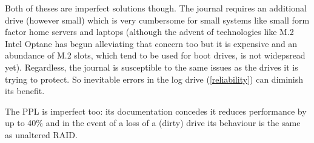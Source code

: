         Both of theses are imperfect solutions though. The journal requires an
        additional drive (however small) which is very cumbersome for small
        systems like small form factor home servers and laptops (although the
        advent of technologies like M.2 Intel Optane \cite{Optane_homepage} has
        begun alleviating that concern too but it is expensive and an abundance
        of M.2 slots, which tend to be used for boot drives, is not widepsread
        yet). Regardless, the journal is susceptible to the same issues as the
        drives it is trying to protect.  So inevitable errors in the log drive
        (\ref{reliability}) can diminish its benefit.

        The PPL is imperfect too: its documentation \cite{PPL} concedes it
        reduces performance by up to 40\% and in the event of a loss of a
        (dirty) drive its behaviour is the same as unaltered RAID.

